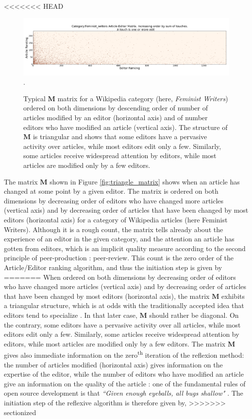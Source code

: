 <<<<<<< HEAD
\begin{figure}[!t]
\centering
\includegraphics[width=2.0\columnwidth]{Figures/Category_Feminist_writerstriangle_matrix_corrected.png}.
\caption{Typical $\mathbf{M}$ matrix for a Wikipedia category (here, {\it Feminist Writers}) ordered on both dimensions by descending order of number of articles modified by an editor (horizontal axis) and of number editors who have modified an article (vertical axis). The structure of $\mathbf{M}$ is triangular and shows that some editors have a pervasive activity over articles, while most editors edit only a few. Similarly, some articles receive widespread attention by editors, while most articles are modified only by a few editors.}
\label{fig:triangle}
\end{figure}


The matrix $\mathbf{M}$ shown in Figure \ref{fig:triangle_matrix} shows when an article has changed at some point by a given editor. The matrix is ordered on both dimensions by decreasing order of editors who have changed more articles (vertical axis) and by decreasing order of articles that have been changed by most editors (horizontal axis) for a category of Wikipedia articles (here Feminist Writers). Although it is a rough count, the matrix tells already about the experience of an editor in the given category, and the attention an article has gotten from editors, which is an implicit quality measure according to the second principle of peer-production : peer-review. This count is the zero order of the Article/Editor ranking algorithm, and thus the initiation step is given by 
=======
When ordered on both dimensions by decreasing order of editors who have changed more articles (vertical axis) and by decreasing order of articles that have been changed by most editors (horizontal axis), the matrix $\mathbf{M}$ exhibits a triangular structure, which is at odds with the traditionally accepted idea that editors tend to specialize \cite{}. In that later case, $\mathbf{M}$ should rather be diagonal. On the contrary, some editors have a pervasive activity over all articles, while most editors edit only a few. Similarly, some articles receive widespread attention by editors, while most articles are modified only by a few editors. The matrix $\mathbf{M}$ gives also immediate information on the zero\textsuperscript{th} iteration of the reflexion method: the number of articles modified (horizontal axis) gives information on the expertise of the editor, while the number of editors who have modified an article give an information on the quality of the article : one of the fundamental rules of open source development is that {\it ``Given enough eyeballs, all bugs shallow"} \cite{raymond1999}. The initiation step of the reflexive algorithm is therefore given by,
>>>>>>> sectionized

